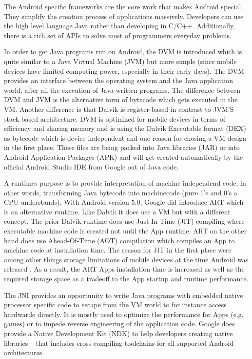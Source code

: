 The Android specific frameworks are the core work that makes Android
special. They simplify the creation process of applications massively.
Developers can use the high level language Java rather than developing
in C/C++. Additionally, there is a rich set of APIs to solve most of
programmers everyday problems.

In order to get Java programs run on Android, the DVM is introduced
which is quite similar to a Java Virtual Machine (JVM) but more simple (since
mobile devices have limited computing power, especially in their early days).
The DVM provides an interface between the operating system and
the Java application world, after all the execution of Java written programs.
The difference between DVM and JVM is the alternative form of bytecode
which gets executed in the VM. Another difference is that Dalvik is
register-based in contrast to JVM'S stack based architecture.
DVM is optimized for mobile devices
in terms of efficiency and sharing memory and is using the
Dalvik Executable format (DEX) as bytecode which is device
independent and one reason for chosing a VM design in the first place\parencite[p.11f]{levin}. These  files are being
packed into Java libraries (JAR) or into Android Application Packages (APK)
and will get created automatically by the official Android Studio IDE from Google out
of Java code.

A runtimes purpose is to provide
interpretation of machine independend code, in other words,
transforming Java bytecode into machinecode (pure 1's and 0's a CPU understands).
With Android version 5.0, Google did introduce ART which is an
alternative runtime. Like Dalvik it does use a VM but with a
different concept.
The prior Dalvik runtime does use Just-In-Time (JIT) compiling
where executable machine code is created not until the App runtime.
ART on the other hand does use Ahead-Of-Time (AOT) compilation
which compiles an App to machine code at installation time.
The reason for JIT in the first place were among other things
storage limitations of mobile devices at the time Android was released
\parencite[p.11f]{levin}. As a result, the ART Apps installation time
is increased as well as the required storage space as a tradeoff
to the App startup and runtime performance.

The JNI provides an opportunity to write Java programs with embedded
native processor specific code to escape from the VM world to for
instance access hardwarde directly.
It is mostly used to optimize the performance for Apps (e.g. games)
or to impede reverse engineering of the application code.
Google does provide a Native Development Kit (NDK) to help
developers creating native libraries ~\parencite{ndk} that includes
cross compiling toolchains for all supported Android architectures.

